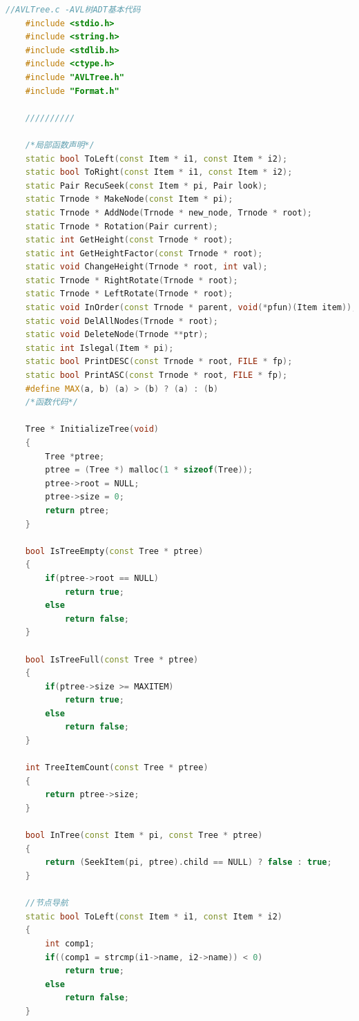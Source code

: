 \documentclass[12pt, a4paper, oneside]{ctexart}
\begin{document}
\begin{framed}
\begin{lstlisting}[language=C++]
    //AVLTree.c -AVL树ADT基本代码
    #include <stdio.h>
    #include <string.h>
    #include <stdlib.h>
    #include <ctype.h>
    #include "AVLTree.h"
    #include "Format.h"
    
    //////////
    
    /*局部函数声明*/
    static bool ToLeft(const Item * i1, const Item * i2);
    static bool ToRight(const Item * i1, const Item * i2);
    static Pair RecuSeek(const Item * pi, Pair look);
    static Trnode * MakeNode(const Item * pi);
    static Trnode * AddNode(Trnode * new_node, Trnode * root);
    static Trnode * Rotation(Pair current);
    static int GetHeight(const Trnode * root);
    static int GetHeightFactor(const Trnode * root);
    static void ChangeHeight(Trnode * root, int val);
    static Trnode * RightRotate(Trnode * root);
    static Trnode * LeftRotate(Trnode * root);
    static void InOrder(const Trnode * parent, void(*pfun)(Item item));
    static void DelAllNodes(Trnode * root);
    static void DeleteNode(Trnode **ptr);
    static int Islegal(Item * pi);
    static bool PrintDESC(const Trnode * root, FILE * fp);
    static bool PrintASC(const Trnode * root, FILE * fp);
    #define MAX(a, b) (a) > (b) ? (a) : (b)
    /*函数代码*/
    
    Tree * InitializeTree(void)
    {
        Tree *ptree;
        ptree = (Tree *) malloc(1 * sizeof(Tree));
        ptree->root = NULL;
        ptree->size = 0;
        return ptree;
    }
    
    bool IsTreeEmpty(const Tree * ptree)
    {
        if(ptree->root == NULL)
            return true;
        else
            return false;
    }
    
    bool IsTreeFull(const Tree * ptree)
    {
        if(ptree->size >= MAXITEM)
            return true;
        else
            return false;
    }
    
    int TreeItemCount(const Tree * ptree)
    {
        return ptree->size;
    }
    
    bool InTree(const Item * pi, const Tree * ptree)
    {
        return (SeekItem(pi, ptree).child == NULL) ? false : true;
    }
    
    //节点导航
    static bool ToLeft(const Item * i1, const Item * i2)
    {
        int comp1;
        if((comp1 = strcmp(i1->name, i2->name)) < 0)
            return true;
        else
            return false;
    }
    

\end{lstlisting}
\end{framed}
\end{document}
